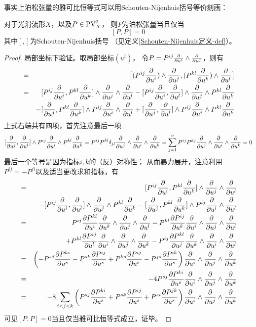 

事实上泊松张量的雅可比恒等式可以用Schouten-Nijenhuis括号等价刻画：

\begin{prop}对于光滑流形$X$，以及$P\in\operatorname{PV}^2_X$，
则$P$为泊松张量当且仅当
$$[P,P]=0$$
其中$[,]$为Schouten-Nijenhuis括号
（见定义\ref{Schouten-Nijenhuis定义-def}）。
\end{prop}

\begin{proof}
局部坐标下验证。取局部坐标$(u^i)$，
令$P=P^{ij}\frac{\partial } {\partial u^i}\wedge\frac{\partial } {\partial u^j}$，则有
\begin{eqnarray*}
     [P,P]
&=&
     \big[(P^{ij}\pp{u^i})\wedge\pp{u^j},
     (P^{kl}\pp{u^k})\wedge\pp{u^l}\big]\\
&=&
     [P^{ij}\pp{u^i},P^{kl}\pp{u^k}]\wedge\pp{u^j}\wedge\pp{u^l}
    -[P^{ij}\pp{u^i},\pp{u^l}]\wedge\pp{u^j}\wedge P^{kl}\pp{u^k}\\
& &
    -[\pp{u^j},P^{kl}\pp{u^k}]\wedge P^{ij}\pp{u^i}\wedge\pp{u^l}
    +[\pp{u^j},\pp{u^l}]\wedge P^{ij}\pp{u^i}\wedge P^{kl}\pp{u^k}
\end{eqnarray*}
上式右端共有四项，首先注意最后一项
$$[\frac{\partial } {\partial u^j},\frac{\partial } {\partial u^l}]\wedge P^{ij}\frac{\partial } {\partial u^i}\wedge P^{kl}\frac{\partial } {\partial u^k}
=P^{ij}P^{kl}\delta_{jl}\frac{\partial } {\partial u^j}\wedge\frac{\partial } {\partial u^i}\wedge\frac{\partial } {\partial u^k}
=\sum_{j=1}^nP^{ij}P^{kj}
 \frac{\partial } {\partial u^j}\wedge\frac{\partial } {\partial u^i}\wedge\frac{\partial } {\partial u^k}=0$$
最后一个等号是因为指标$i,k$的（反）对称性；
从而暴力展开，注意利用$P^{ij}=-P^{ji}$以及适当更改求和指标，有
\begin{eqnarray*}
     [P,P]
&=&
     [P^{ij}\pp{u^i},P^{kl}\pp{u^k}]\wedge\pp{u^j}\wedge\pp{u^l}\\
& &
    -[P^{ij}\pp{u^i},\pp{u^l}]\wedge\pp{u^j}\wedge P^{kl}\pp{u^k}
    -[\pp{u^j},P^{kl}\pp{u^k}]\wedge P^{ij}\pp{u^i}\wedge\pp{u^l}\\
&=&
     P^{ij}\pfrac{P^{kl}}{u^i}
     \pp{u^k}\wedge\pp{u^j}\wedge\pp{u^l}
    -P^{kl}\pfrac{P^{ij}}{u^k}
     \pp{u^i}\wedge\pp{u^j}\wedge\pp{u^l}\\
& &
    +P^{kl}\pfrac{P^{ij}}{u^l}
     \pp{u^i}\wedge\pp{u^j}\wedge\pp{u^k}
    -P^{ij}\pfrac{P^{kl}}{u^j}
     \pp{u^k}\wedge\pp{u^i}\wedge\pp{u^l}\\
&=&
     \left(
       -P^{sj}\pfrac{P^{ki}}{u^s}
       -P^{sk}\pfrac{P^{ij}}{u^s}
       +P^{ks}\pfrac{P^{ij}}{u^s}
       -P^{js}\pfrac{P^{ik}}{u^s}
     \right)
     \pp{u^i}\wedge\pp{u^j}\wedge\pp{u^k}\\
&=&
     -4P^{sj}\pfrac{P^{ki}}{u^s}
     \pp{u^i}\wedge\pp{u^j}\wedge\pp{u^k}\\
&=&
     -8\sum_{i<j<k}
       \left(
          P^{sj}\pfrac{P^{ki}}{u^s}
         +P^{sk}\pfrac{P^{ij}}{u^s}
         +P^{si}\pfrac{P^{jk}}{u^s}
       \right)
     \pp{u^i}\wedge\pp{u^j}\wedge\pp{u^k}
\end{eqnarray*}
可见$[P,P]=0$当且仅当雅可比恒等式成立，证毕。
\end{proof}

